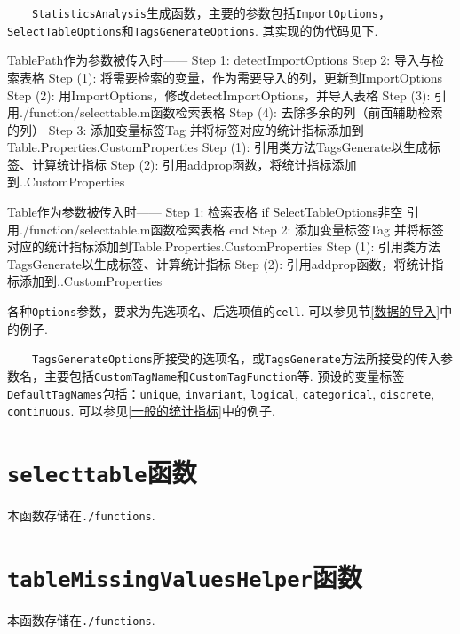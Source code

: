 \documentclass[a4paper, titlepage]{article}
\begin{document}
    　　\texttt{StatisticsAnalysis}生成函数，主要的参数包括\texttt{ImportOptions}，\texttt{SelectTableOptions}和\texttt{TagsGenerateOptions}. 其实现的伪代码见下.
\begin{matlabcode}
TablePath作为参数被传入时——
Step 1: detectImportOptions
Step 2: 导入与检索表格
    Step (1): 将需要检索的变量，作为需要导入的列，更新到ImportOptions
    Step (2): 用ImportOptions，修改detectImportOptions，并导入表格
    Step (3): 引用./function/selecttable.m函数检索表格
    Step (4): 去除多余的列（前面辅助检索的列）
Step 3: 添加变量标签Tag
        并将标签对应的统计指标添加到Table.Properties.CustomProperties
    Step (1): 引用类方法TagsGenerate以生成标签、计算统计指标
    Step (2): 引用addprop函数，将统计指标添加到..CustomProperties
\end{matlabcode}
\begin{matlabcode}
Table作为参数被传入时——
Step 1: 检索表格
    if SelectTableOptions非空
        引用./function/selecttable.m函数检索表格
    end
Step 2: 添加变量标签Tag
        并将标签对应的统计指标添加到Table.Properties.CustomProperties
    Step (1): 引用类方法TagsGenerate以生成标签、计算统计指标
    Step (2): 引用addprop函数，将统计指标添加到..CustomProperties
\end{matlabcode}
    各种\texttt{Options}参数，要求为先选项名、后选项值的\texttt{cell}. 可以参见节\ref{数据的导入}中的例子.

    　　\texttt{TagsGenerateOptions}所接受的选项名，或\texttt{TagsGenerate}方法所接受的传入参数名，主要包括\texttt{CustomTagName}和\texttt{CustomTagFunction}\!等. 预设的变量标签\texttt{DefaultTagNames}包括：\texttt{unique}, \texttt{invariant}, \texttt{logical}, \texttt{categorical}, \texttt{discrete}, \texttt{continuous}. 可以参见\ref{一般的统计指标}中的例子.

    \section{\texttt{selecttable}函数}\label{app:selecttable}
    本函数存储在\texttt{./functions}.
    \section{\texttt{tableMissingValuesHelper}函数}\label{app:tableMissingValuesHelper}
    本函数存储在\texttt{./functions}.
\end{document}
